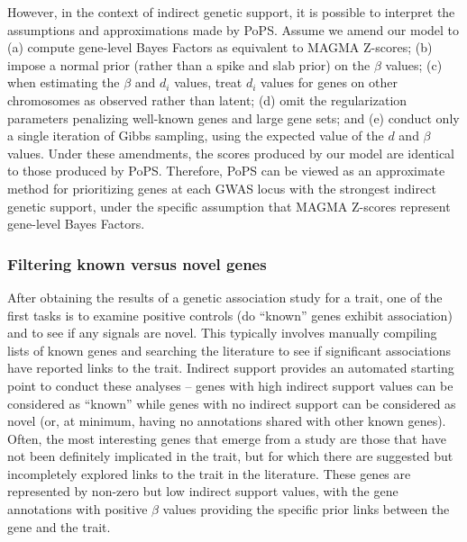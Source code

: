 However, in the context of indirect genetic support, it is possible to
interpret the assumptions and approximations made by PoPS. Assume we amend
our model to (a) compute gene-level Bayes Factors as equivalent to
MAGMA Z-scores; (b) impose a normal prior (rather than a spike and
slab prior) on the $\beta$ values; (c) when estimating the $\beta$
and $d_i$ values, treat $d_i$ values for genes on other chromosomes as
observed rather than latent; (d) omit the regularization parameters
penalizing well-known genes and large gene sets; and (e) conduct only a single iteration
of Gibbs sampling, using the expected value of the $d$ and $\beta$
values. Under these amendments, the scores produced by our model are
identical to those produced by PoPS. Therefore, PoPS can be
viewed as an approximate method for prioritizing genes at each GWAS locus with the strongest indirect
genetic support, under the specific assumption that MAGMA Z-scores
represent gene-level Bayes Factors.

\subsubsection{Filtering known versus novel genes}
After obtaining the results of a genetic association study for a trait, one of the
first tasks is to examine positive controls (do ``known'' genes
exhibit association) and to see if any signals are novel. This
typically involves manually compiling lists of known genes and
searching the literature to see if significant associations have
reported links to the trait. Indirect support provides an
automated starting point to conduct these analyses -- genes with high
indirect support values can be considered as ``known'' while genes
with no indirect support can be considered as novel (or, at minimum,
having no annotations shared with other known genes). Often, the most
interesting genes that emerge from a study are those that have not
been definitely implicated in the trait, but for which there are
suggested but incompletely explored links to the trait in the
literature. These genes are represented by non-zero but low indirect
support values, with the gene annotations with positive $\beta$ values
providing the specific prior links between the gene and the trait.

